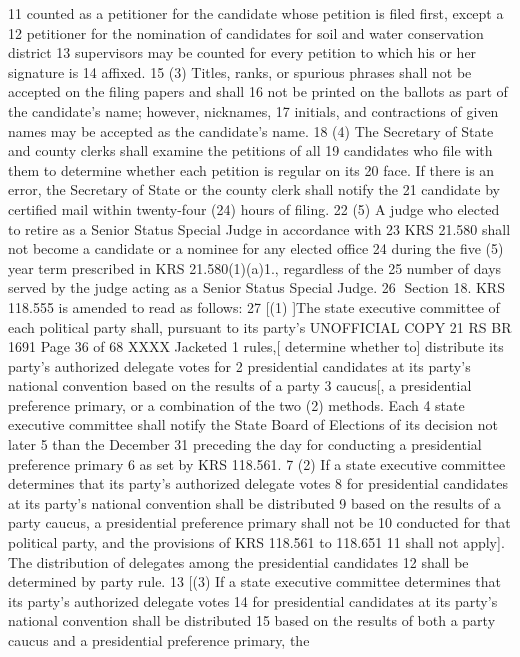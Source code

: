 11 counted as a petitioner for the candidate whose petition is filed first, except a
12 petitioner for the nomination of candidates for soil and water conservation district
13 supervisors may be counted for every petition to which his or her signature is
14 affixed.
15 (3) Titles, ranks, or spurious phrases shall not be accepted on the filing papers and shall
16 not be printed on the ballots as part of the candidate's name; however, nicknames,
17 initials, and contractions of given names may be accepted as the candidate's name.
18 (4) The Secretary of State and county clerks shall examine the petitions of all
19 candidates who file with them to determine whether each petition is regular on its
20 face. If there is an error, the Secretary of State or the county clerk shall notify the
21 candidate by certified mail within twenty-four (24) hours of filing.
22 (5) A judge who elected to retire as a Senior Status Special Judge in accordance with
23 KRS 21.580 shall not become a candidate or a nominee for any elected office
24 during the five (5) year term prescribed in KRS 21.580(1)(a)1., regardless of the
25 number of days served by the judge acting as a Senior Status Special Judge.
26 Section 18. KRS 118.555 is amended to read as follows:
27 [(1) ]The state executive committee of each political party shall, pursuant to its party's 
UNOFFICIAL COPY 21 RS BR 1691
Page 36 of 68
XXXX Jacketed
1 rules,[ determine whether to] distribute its party's authorized delegate votes for
2 presidential candidates at its party's national convention based on the results of a party
3 caucus[, a presidential preference primary, or a combination of the two (2) methods. Each
4 state executive committee shall notify the State Board of Elections of its decision not later
5 than the December 31 preceding the day for conducting a presidential preference primary
6 as set by KRS 118.561.
7 (2) If a state executive committee determines that its party's authorized delegate votes
8 for presidential candidates at its party's national convention shall be distributed
9 based on the results of a party caucus, a presidential preference primary shall not be
10 conducted for that political party, and the provisions of KRS 118.561 to 118.651
11 shall not apply]. The distribution of delegates among the presidential candidates
12 shall be determined by party rule.
13 [(3) If a state executive committee determines that its party's authorized delegate votes
14 for presidential candidates at its party's national convention shall be distributed
15 based on the results of both a party caucus and a presidential preference primary, the
